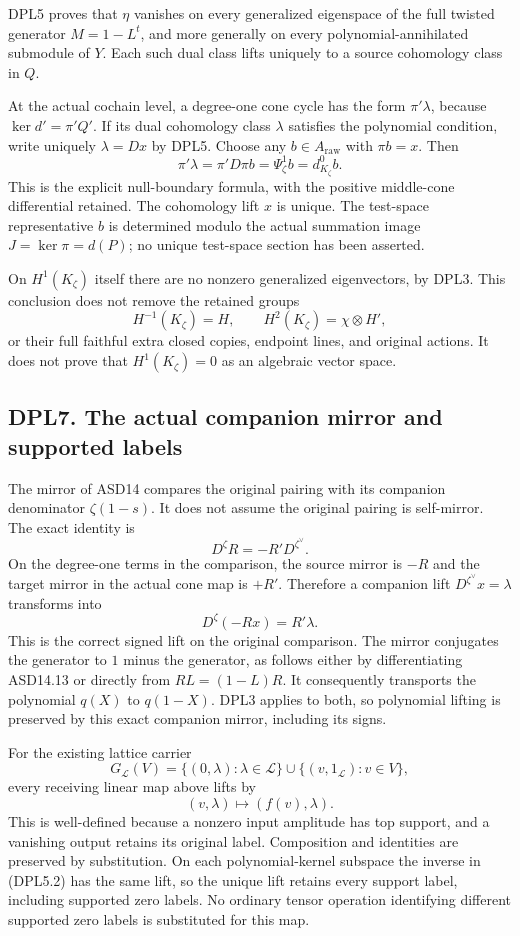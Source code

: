 DPL5 proves that \(\eta\) vanishes on every generalized eigenspace of
the full twisted generator \(M=1-L^t\), and more generally on every
polynomial-annihilated submodule of \(Y\). Each such dual class lifts
uniquely to a source cohomology class in \(Q\).

At the actual cochain level, a degree-one cone cycle has the form
\(\pi'\lambda\), because \(\ker d'=\pi'Q'\). If its dual cohomology
class \(\lambda\) satisfies the polynomial condition, write uniquely
\(\lambda=Dx\) by DPL5. Choose any \(b\in A_{\mathrm{raw}}\) with
\(\pi b=x\). Then \[
\pi'\lambda=\pi'D\pi b=\Psi_\zeta^1 b=d_{K_\zeta}^0 b.
\tag{DPL6.3}
\] This is the explicit null-boundary formula, with the positive
middle-cone differential retained. The cohomology lift \(x\) is unique.
The test-space representative \(b\) is determined modulo the actual
summation image \(J=\ker\pi=d(P)\); no unique test-space section has
been asserted.

On \(H^1(K_\zeta)\) itself there are no nonzero generalized
eigenvectors, by DPL3. This conclusion does not remove the retained
groups \[
H^{-1}(K_\zeta)=H,\qquad
H^2(K_\zeta)=\chi\otimes H',
\] or their full faithful extra closed copies, endpoint lines, and
original actions. It does not prove that \(H^1(K_\zeta)=0\) as an
algebraic vector space.

\subsection{DPL7. The actual companion mirror and supported
labels}\label{dpl7.-the-actual-companion-mirror-and-supported-labels}

The mirror of ASD14 compares the original pairing with its companion
denominator \(\zeta(1-s)\). It does not assume the original pairing is
self-mirror. The exact identity is \[
D^\zeta R=-R'D^{\zeta^\vee}.
\tag{DPL7.1}
\] On the degree-one terms in the comparison, the source mirror is
\(-R\) and the target mirror in the actual cone map is \(+R'\).
Therefore a companion lift \(D^{\zeta^\vee}x=\lambda\) transforms into
\[
D^\zeta(-Rx)=R'\lambda.
\tag{DPL7.2}
\] This is the correct signed lift on the original comparison. The
mirror conjugates the generator to \(1\) minus the generator, as follows
either by differentiating ASD14.13 or directly from \(RL=(1-L)R\). It
consequently transports the polynomial \(q(X)\) to \(q(1-X)\). DPL3
applies to both, so polynomial lifting is preserved by this exact
companion mirror, including its signs.

For the existing lattice carrier \[
G_{\mathcal L}(V)=
\{(0,\lambda):\lambda\in\mathcal L\}
\cup\{(v,1_{\mathcal L}):v\in V\},
\] every receiving linear map above lifts by \[
(v,\lambda)\longmapsto(f(v),\lambda).
\tag{DPL7.3}
\] This is well-defined because a nonzero input amplitude has top
support, and a vanishing output retains its original label. Composition
and identities are preserved by substitution. On each polynomial-kernel
subspace the inverse in (DPL5.2) has the same lift, so the unique lift
retains every support label, including supported zero labels. No
ordinary tensor operation identifying different supported zero labels is
substituted for this map.

